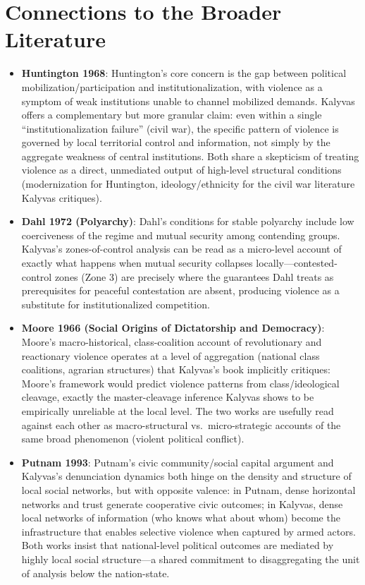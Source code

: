 \documentclass[12pt]{article}
\begin{document}
\section{Connections to the Broader Literature}

\begin{itemize}[leftmargin=*, itemsep=4pt]
    \item \textbf{Huntington 1968}: Huntington's core concern is the gap between political mobilization/participation and institutionalization, with violence as a symptom of weak institutions unable to channel mobilized demands. Kalyvas offers a complementary but more granular claim: even within a single ``institutionalization failure'' (civil war), the specific pattern of violence is governed by local territorial control and information, not simply by the aggregate weakness of central institutions. Both share a skepticism of treating violence as a direct, unmediated output of high-level structural conditions (modernization for Huntington, ideology/ethnicity for the civil war literature Kalyvas critiques).
    \item \textbf{Dahl 1972 (Polyarchy)}: Dahl's conditions for stable polyarchy include low coerciveness of the regime and mutual security among contending groups. Kalyvas's zones-of-control analysis can be read as a micro-level account of exactly what happens when mutual security collapses locally---contested-control zones (Zone 3) are precisely where the guarantees Dahl treats as prerequisites for peaceful contestation are absent, producing violence as a substitute for institutionalized competition.
    \item \textbf{Moore 1966 (Social Origins of Dictatorship and Democracy)}: Moore's macro-historical, class-coalition account of revolutionary and reactionary violence operates at a level of aggregation (national class coalitions, agrarian structures) that Kalyvas's book implicitly critiques: Moore's framework would predict violence patterns from class/ideological cleavage, exactly the master-cleavage inference Kalyvas shows to be empirically unreliable at the local level. The two works are usefully read against each other as macro-structural vs.\ micro-strategic accounts of the same broad phenomenon (violent political conflict).
    \item \textbf{Putnam 1993}: Putnam's civic community/social capital argument and Kalyvas's denunciation dynamics both hinge on the density and structure of local social networks, but with opposite valence: in Putnam, dense horizontal networks and trust generate cooperative civic outcomes; in Kalyvas, dense local networks of information (who knows what about whom) become the infrastructure that enables selective violence when captured by armed actors. Both works insist that national-level political outcomes are mediated by highly local social structure---a shared commitment to disaggregating the unit of analysis below the nation-state.

\end{itemize}
\end{document}
